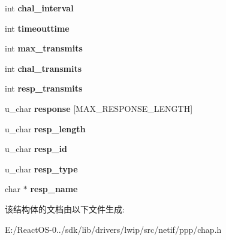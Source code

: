 \begin{DoxyCompactItemize}
int {\bfseries chal\+\_\+interval}
\item 
\mbox{\label{structchap__state_a90a2c2bd3076b1db20eca1ac2601d280}} 
int {\bfseries timeouttime}
\item 
\mbox{\label{structchap__state_a5a5696ce7040ab9769f64bab0ffbe825}} 
int {\bfseries max\+\_\+transmits}
\item 
\mbox{\label{structchap__state_a4d8ae182fc466771022b35d9c5c41f2f}} 
int {\bfseries chal\+\_\+transmits}
\item 
\mbox{\label{structchap__state_a8b6e7c318e18b67c7d39ee0dca3d230e}} 
int {\bfseries resp\+\_\+transmits}
\item 
\mbox{\label{structchap__state_a0e63b4e0621598097d068de419401e44}} 
u\+\_\+char {\bfseries response} \mbox{[}M\+A\+X\+\_\+\+R\+E\+S\+P\+O\+N\+S\+E\+\_\+\+L\+E\+N\+G\+TH\mbox{]}
\item 
\mbox{\label{structchap__state_af84fa994067a3b46c7529ad4c7ed63e8}} 
u\+\_\+char {\bfseries resp\+\_\+length}
\item 
\mbox{\label{structchap__state_abfcf32921adb80b75936de6721c9230d}} 
u\+\_\+char {\bfseries resp\+\_\+id}
\item 
\mbox{\label{structchap__state_a0eb4b9f34d8b1dbd413dd437dd58ec50}} 
u\+\_\+char {\bfseries resp\+\_\+type}
\item 
\mbox{\label{structchap__state_ac72dd89bc14075810af9756b6bae93a6}} 
char $\ast$ {\bfseries resp\+\_\+name}
\end{DoxyCompactItemize}


该结构体的文档由以下文件生成\+:\begin{DoxyCompactItemize}
\item 
E\+:/\+React\+O\+S-\/0../sdk/lib/drivers/lwip/src/netif/ppp/chap.\+h\end{DoxyCompactItemize}
